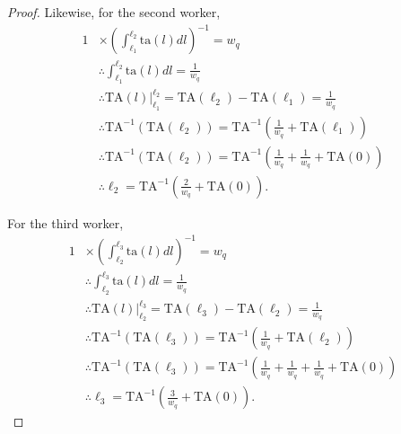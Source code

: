\documentclass[hidelinks, nonatbib]{elsarticle}
\begin{document}
\begin{lemma}
\begin{proof}
        Likewise, for the second worker,
        \begin{align}
        1 
        &\times 
        \left(
            \int_{\ell_1}^{\ell_2}
            \text{ta}(l)
            dl
        \right) ^ {-1}
        =
        w_q
        \\
        &\therefore
        \int_{\ell_1}^{\ell_2}
        \text{ta}(l)
        dl
        =
        \frac{1}{w_q}
        \\
        &\therefore
        \text{TA}(l)
        \big|_{\ell_1}^{\ell_2}
        =
        \text{TA}(\ell_2)
        -
        \text{TA}(\ell_1)
        =
        \frac{1}{w_q}
        \\
        &\therefore
        \text{TA}^{-1}(
            \text{TA}(\ell_2)
        )
        =
        \text{TA}^{-1}\left(
            \frac{1}{w_q}
            +
            \text{TA}(\ell_1)
        \right)
        \\
        &\therefore
        \text{TA}^{-1}(
            \text{TA}(\ell_2)
        )
        =
        \text{TA}^{-1}\left(
            \frac{1}{w_q}
            +
            \frac{1}{w_q}
            +
            \text{TA}(0)
        \right)
        \\
        &\therefore
        \ell_2
        =
        \text{TA}^{-1}\left(
            \frac{2}{w_q}
            +
            \text{TA}(0)
        \right)
        .
        \end{align}
        
        For the third worker,
        \begin{align}
        1 
        &\times 
        \left(
            \int_{\ell_2}^{\ell_3}
            \text{ta}(l)
            dl
        \right) ^ {-1}
        =
        w_q
        \\
        &\therefore
        \int_{\ell_2}^{\ell_3}
        \text{ta}(l)
        dl
        =
        \frac{1}{w_q}
        \\
        &\therefore
        \text{TA}(l)
        \big|_{\ell_2}^{\ell_3}
        =
        \text{TA}(\ell_3)
        -
        \text{TA}(\ell_2)
        =
        \frac{1}{w_q}
        \\
        &\therefore
        \text{TA}^{-1}(
            \text{TA}(\ell_3)
        )
        =
        \text{TA}^{-1}\left(
            \frac{1}{w_q}
            +
            \text{TA}(\ell_2)
        \right)
        \\
        &\therefore
        \text{TA}^{-1}(
            \text{TA}(\ell_3)
        )
        =
        \text{TA}^{-1}\left(
            \frac{1}{w_q}
            +
            \frac{1}{w_q}
            +
            \frac{1}{w_q}
            +
            \text{TA}(0)
        \right)
        \\
        &\therefore
        \ell_3
        =
        \text{TA}^{-1}\left(
            \frac{3}{w_q}
            +
            \text{TA}(0)
        \right)
        .
        \end{align}
        

\end{proof}
\end{lemma}
\end{document}
